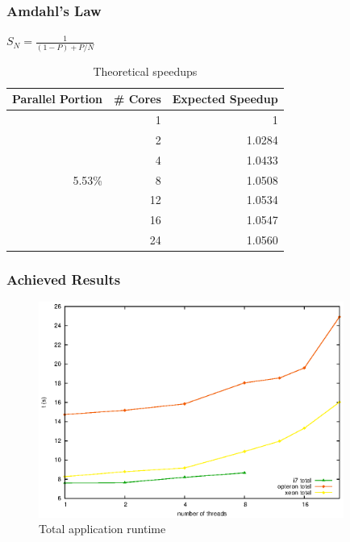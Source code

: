 \documentclass{beamer}
\begin{document}
\begin{frame}
	\frametitle{Amdahl's Law}
		\begin{center}
		$S_{N}=\frac{1}{(1-P) + P/N}$

		
			\begin{table}[!htp]
			\begin{tabular}{|r|r|r|}
			\hline
			\textbf{Parallel Portion} & \textbf{\# Cores} & \textbf{Expected Speedup}\\
			\hline
			 & 1 & 1 \\
			 & 2 & 1.0284 \\
			 & 4 & 1.0433 \\
			 5.53\% & 8 & 1.0508 \\
			 & 12 & 1.0534 \\
			 & 16 & 1.0547 \\
			 & 24 & 1.0560 \\
			\hline
			\end{tabular}
			\caption{Theoretical speedups}
			\label{tab:testcases}
			\end{table}
		\end{center}	
\end{frame}

\begin{frame}
	\frametitle{Achieved Results}
	\begin{center}

	\begin{figure}[!htp]
		\includegraphics[width=10cm]{images/total.eps}
		\caption{Total application runtime}
		\label{fig:roofline}
	\end{figure}
	\end{center}
\end{frame}
\end{document}
